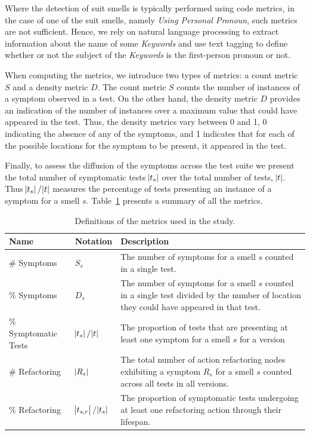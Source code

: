 Where the detection of \gls{suit} smells is typically performed using code metrics, in the case of one of the \gls{suit} smells, namely \emph{Using Personal Pronoun}, such metrics are not sufficient. Hence, we rely on natural language processing to extract information about the name of some \emph{Keywords} and use text tagging to define whether or not the subject of the \emph{Keywords} is the first-person pronoun or not.

When computing the metrics, we introduce two types of metrics: a count metric $S$ and a density metric $D$. The count metric $S$ counts the number of instances of a symptom observed in a test. On the other hand, the density metric $D$ provides an indication of the number of instances over a maximum value that could have appeared in the test. Thus, the density metrics vary between 0 and 1, 0 indicating the absence of any of the symptoms, and 1 indicates that for each of the possible locations for the symptom to be present, it appeared in the test.

Finally, to assess the diffusion of the symptoms across the test suite we present the total number of symptomatic tests $\abs{t_s}$ over the total number of tests, $\abs{t}$. Thus $\abs{t_s} / \abs{t}$ measures the percentage of tests presenting an instance of a symptom for a smell $s$. Table~\ref{tab:metrics} presents a summary of all the metrics.

\begin{table}
\centering

\caption{Definitions of the metrics used in the study.}
\label{tab:metrics}

\begin{tabular}{>{\raggedright}p{1.2in}>{\raggedright}p{0.6in}>{\raggedright}p{3in}}

\toprule
\scriptsize{\textbf{Name}} & \scriptsize{\textbf{Notation}} & \scriptsize{\textbf{Description}} \tabularnewline
\toprule

\scriptsize{\# Symptoms} & \scriptsize{$S_s$} & \scriptsize{The number of symptoms for a smell $s$ counted in a single test.} \tabularnewline
\scriptsize{\% Symptoms} & \scriptsize{$D_s$} & \scriptsize{The number of symptoms for a smell $s$ counted in a single test divided by the number of location they could have appeared in that test.} \tabularnewline
\scriptsize{\% Symptomatic Tests} & \scriptsize{$\abs{t_s} / \abs{t}$} & \scriptsize{The proportion of tests that are presenting at least one symptom for a smell $s$ for a version} \tabularnewline
\scriptsize{\# Refactoring} & \scriptsize{$\abs{R_{s}}$} & \scriptsize{The total number of action refactoring nodes exhibiting a symptom $R_{s}$ for a smell $s$ counted across all tests in all versions.} \tabularnewline
\scriptsize{\% Refactoring} & \scriptsize{$\abs{t_{s,r}} / \abs{t_{s}}$} & \scriptsize{The proportion of symptomatic tests undergoing at least one refactoring action through their lifespan.} \tabularnewline
\bottomrule

\end{tabular}

\end{table}

